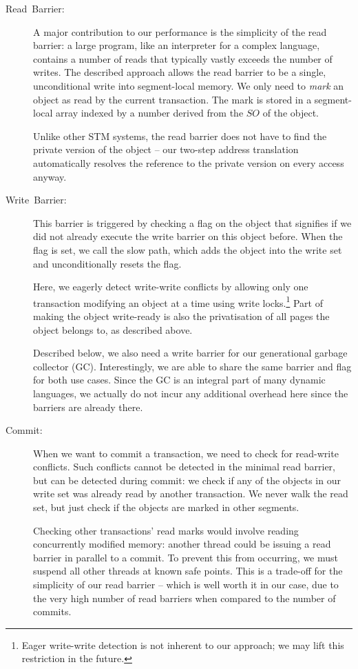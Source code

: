 \documentclass{sigplanconf}
\begin{document}
\begin{description}

\item [{Read~Barrier:}] A major contribution to our performance
  is the simplicity of the read barrier: a large program, like an
  interpreter for a complex language, contains a number of reads that
  typically vastly exceeds the number of writes.  The described
  approach allows the read barrier to be a single, unconditional
  write into segment-local memory. We only need to \emph{mark} an object
  as read by the current transaction. The mark is stored in a
  segment-local array indexed by a number derived from the $SO$
  of the object.

  Unlike other STM systems, the read barrier does not have to find the
  private version of the object -- our two-step address translation
  automatically resolves the reference to the private version on every
  access anyway.

\item [{Write~Barrier:}] This barrier is triggered by checking a flag
  on the object that signifies if we did not already execute the write
  barrier on this object before.  When the flag is set, we call the slow
  path, which adds the object into the write set and unconditionally
  resets the flag.

  Here, we eagerly detect write-write conflicts by allowing only one
  transaction modifying an object at a time using write
  locks.\footnote{Eager write-write detection is not inherent to our
    approach; we may lift this restriction in the future.}  Part of making
  the object write-ready is also the privatisation of all pages the
  object belongs to, as described above.

  Described below, we also need a write barrier for our generational
  garbage collector (GC). Interestingly, we are able to share the same
  barrier and flag for both use cases. Since the GC is an integral
  part of many dynamic languages, we actually do not incur any additional
  overhead here since the barriers are already there.

\item [{Commit:}] When we want to commit a transaction, we need to check
  for read-write conflicts.  Such conflicts cannot be detected in the
  minimal read barrier, but can be detected during commit: we check
  if any of the objects in our write set was already read by another
  transaction. We never walk the read set, but just check if the objects
  are marked in other segments.

  Checking other transactions' read marks would involve reading
  concurrently modified memory: another thread could be issuing a read
  barrier in parallel to a commit.  To prevent this from occurring, we
  must suspend all other threads at known safe points.  This is a
  trade-off for the simplicity of our read barrier -- which is well
  worth it in our case, due to the very high number of read barriers
  when compared to the number of commits.

\end{description}
\end{document}
